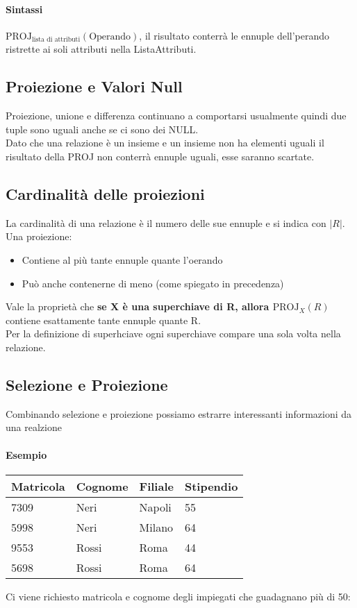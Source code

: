 \paragraph*{Sintassi} $\text{PROJ}_{\text{lista di attributi}}(\text{Operando})$, il risultato
conterrà le ennuple dell'perando ristrette ai soli attributi nella ListaAttributi.
\subsection*{Proiezione e Valori Null}
Proiezione, unione e differenza continuano a comportarsi usualmente quindi due tuple sono uguali
anche se ci sono dei NULL. \\
Dato che una relazione è un insieme e un insieme non ha elementi uguali il risultato
della PROJ non conterrà ennuple uguali, esse saranno scartate.
\subsection*{Cardinalità delle proiezioni}La cardinalità di una relazione è il numero delle sue ennuple e
si indica con $|R|$.\\
Una proiezione:
\begin{itemize}
    \item Contiene al più tante ennuple quante l'oerando
    \item Può anche contenerne di meno (come spiegato in precedenza)
\end{itemize}
Vale la proprietà che \textbf{se X è una superchiave di R, allora  $\text{PROJ}_X(R)$} contiene
esattamente tante ennuple quante R.\\
Per la definizione di superhciave ogni superchiave compare una sola volta nella relazione.\\
\subsection*{Selezione e Proiezione}
Combinando selezione e proiezione possiamo estrarre interessanti informazioni da una realzione
\paragraph*{Esempio}
\begin{table}[]
    \begin{tabular}{|l|l|l|l|}
    \hline
    Matricola & Cognome & Filiale & Stipendio \\ \hline
    7309      & Neri    & Napoli  & 55        \\ \hline
    5998      & Neri    & Milano  & 64        \\ \hline
    9553      & Rossi   & Roma    & 44        \\ \hline
    5698      & Rossi   & Roma    & 64        \\ \hline
    \end{tabular}
\end{table}
Ci viene richiesto matricola e cognome degli impiegati che guadagnano più di 50:
